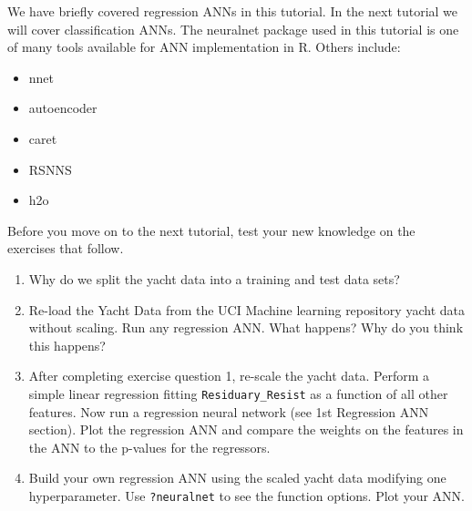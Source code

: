\documentclass[]{book}
\providecommand{\tightlist}{%
  \setlength{\itemsep}{0pt}\setlength{\parskip}{0pt}}
\begin{document}
We have briefly covered regression ANNs in this tutorial. In the next tutorial we will cover classification ANNs. The neuralnet package used in this tutorial is one of many tools available for ANN implementation in R. Others include:

\begin{itemize}
\tightlist
\item
  nnet
\item
  autoencoder
\item
  caret
\item
  RSNNS
\item
  h2o
\end{itemize}

Before you move on to the next tutorial, test your new knowledge on the exercises that follow.

\begin{enumerate}
\def\labelenumi{\arabic{enumi}.}
\item
  Why do we split the yacht data into a training and test data sets?
\item
  Re-load the Yacht Data from the UCI Machine learning repository yacht data without scaling. Run any regression ANN. What happens? Why do you think this happens?
\item
  After completing exercise question 1, re-scale the yacht data. Perform a simple linear regression fitting \texttt{Residuary\_Resist} as a function of all other features. Now run a regression neural network (see 1st Regression ANN section). Plot the regression ANN and compare the weights on the features in the ANN to the p-values for the regressors.
\item
  Build your own regression ANN using the scaled yacht data modifying one hyperparameter. Use \texttt{?neuralnet} to see the function options. Plot your ANN.
\end{enumerate}


\end{document}
